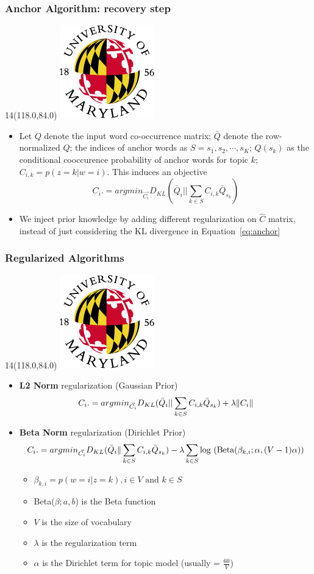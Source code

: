 \documentclass{beamer}
\let\oldframetitle\frametitle
\renewcommand{\frametitle}[1]{
\oldframetitle{#1}
\BottomLogo
}
\newcommand{\BottomLogo}{
\begin{textblock}{14}(118.0,84.0)
\includegraphics[height=.8cm]{figures/umd-logo1.jpg}
\end{textblock}
}
\begin{document}
\begin{frame}
\frametitle{Anchor Algorithm: recovery step}
\begin{itemize}
\item Let $Q$ denote the input word co-occurrence matrix; $\bar{Q}$ denote the
row-normalized $Q$; the indices of anchor words as $S = {s_1, s_2,
  \cdots, s_K}$; $Q(s_k)$ as the conditional cooccurence probability of anchor
words for topic $k$; $C_{i,k} = p(z=k|w=i)$.  This induces an objective
\begin{equation}
\label{eq:anchor}
C_i. = argmin_{\vec{C_i}} D_{KL}(\bar{Q}_i || \sum_{k\in S} C_{i,k} \bar{Q}_{s_k})
\end{equation}

\item We inject prior knowledge by adding different regularization on $\hat C$ matrix, instead of just considering
the KL divergence in Equation~\ref{eq:anchor}
\end{itemize}
\end{frame}

\begin{frame}
\frametitle{Regularized Algorithms}
\begin{itemize}
\item {\bf L2 Norm} regularization (Gaussian Prior)
\begin{equation}
\label{eq:anchorl2}
C_i. = argmin_{\vec{C_i}} D_{KL}(\bar{Q}_i || \sum_{k\in S} C_{i,k} \bar{Q}_{s_k}) +\lambda \|C_i\| \notag
\end{equation}

\item {\bf Beta Norm} regularization (Dirichlet Prior)
\begin{equation}
\label{eq:anchorbeta}
C_i. = argmin_{\vec{C_i}}D_{KL}(\bar{Q}_i \| \sum_{k \in S} C_{i,k} \bar{Q}_{s_k})- \lambda \sum_{k\in S}\mbox{log (Beta}(\beta_{k,i};\alpha,(V-1)\alpha)) \notag
\end{equation}

\begin{itemize}
\item $\beta_{k,i} = p(w=i|z=k), \mbox{$i \in V$ and $k \in S$}$
\item Beta($\beta;a,b$) is the Beta function
\item $V$ is the size of vocabulary
\item $\lambda$ is the regularization term
\item $\alpha$ is the Dirichlet term for topic model (usually = $\frac{60}{V}$)
\end{itemize}
\end{itemize}
\end{frame}
\end{document}
